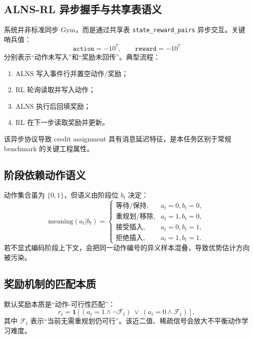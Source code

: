 \documentclass[UTF8,11pt,a4paper]{ctexart}
\begin{document}
\subsection{ALNS-RL 异步握手与共享表语义}
系统并非标准同步 Gym，而是通过共享表 \texttt{state\_reward\_pairs} 异步交互。关键哨兵值：
\begin{equation}
\texttt{action}=-10^7,\qquad \texttt{reward}=-10^7
\end{equation}
分别表示“动作未写入”和“奖励未回传”。典型流程：
\begin{enumerate}
\item ALNS 写入事件行并置空动作/奖励；
\item RL 轮询读取并写入动作；
\item ALNS 执行后回填奖励；
\item RL 在下一步读取奖励并更新。
\end{enumerate}
该异步协议导致 credit assignment 具有消息延迟特征，是本任务区别于常规 benchmark 的关键工程属性。

\subsection{阶段依赖动作语义}
动作集合虽为 \(\{0,1\}\)，但语义由阶段位 \(b_t\) 决定：
\begin{equation}
\mathrm{meaning}(a_t|b_t)=
\begin{cases}
\text{等待/保持},&a_t=0,b_t=0,\\
\text{重规划/移除},&a_t=1,b_t=0,\\
\text{接受插入},&a_t=0,b_t=1,\\
\text{拒绝插入},&a_t=1,b_t=1.
\end{cases}
\end{equation}
若不显式编码阶段上下文，会把同一动作编号的异义样本混叠，导致优势估计方向被污染。

\subsection{奖励机制的匹配本质}
默认奖励本质是“动作-可行性匹配”：
\begin{equation}
r_t=\mathbf{1}\left[(a_t=1\land \neg\mathcal{F}_t)\ \lor\ (a_t=0\land \mathcal{F}_t)\right],
\end{equation}
其中 \(\mathcal{F}_t\) 表示“当前无需重规划仍可行”。该近二值、稀疏信号会放大不平衡动作学习难度。
\end{document}
